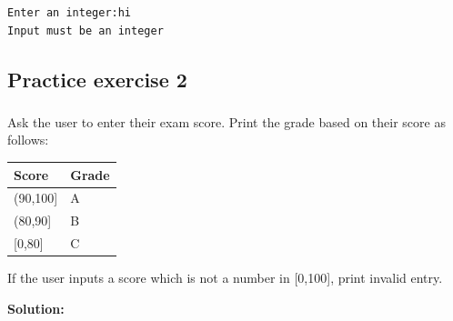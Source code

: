 \documentclass[
  letterpaper,
  DIV=11,
  numbers=noendperiod]{scrreprt}
\begin{document}
\begin{verbatim}
Enter an integer:hi
Input must be an integer
\end{verbatim}

\hypertarget{practice-exercise-2-1}{%
\subsection{Practice exercise 2}\label{practice-exercise-2-1}}

\hypertarget{section}{%
\subsubsection{}\label{section}}

Ask the user to enter their exam score. Print the grade based on their
score as follows:

\begin{longtable}[]{@{}ll@{}}
\toprule\noalign{}
Score & Grade \\
\midrule\noalign{}
\endhead
\bottomrule\noalign{}
\endlastfoot
(90,100{]} & A \\
(80,90{]} & B \\
{[}0,80{]} & C \\
\end{longtable}

If the user inputs a score which is not a number in {[}0,100{]}, print
invalid entry.

\textbf{Solution:}
\end{document}

